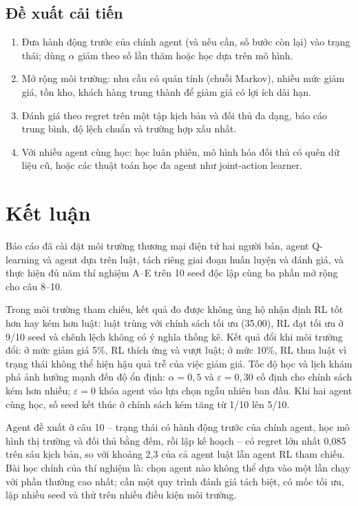 \documentclass[12pt,a4paper]{report}
\begin{document}
\subsection{Đề xuất cải tiến}
\begin{enumerate}
\item Đưa hành động trước của chính agent (và nếu cần, số bước còn lại) vào trạng
  thái; dùng $\alpha$ giảm theo số lần thăm hoặc học dựa trên mô hình.
\item Mở rộng môi trường: nhu cầu có quán tính (chuỗi Markov), nhiều mức giảm giá,
  tồn kho, khách hàng trung thành để giảm giá có lợi ích dài hạn.
\item Đánh giá theo regret trên một tập kịch bản và đối thủ đa dạng, báo cáo trung
  bình, độ lệch chuẩn và trường hợp xấu nhất.
\item Với nhiều agent cùng học: học luân phiên, mô hình hóa đối thủ có quên dữ liệu
  cũ, hoặc các thuật toán học đa agent như joint-action learner.
\end{enumerate}

\section{Kết luận}
\label{chap:conclusion}
Báo cáo đã cài đặt môi trường thương mại điện tử hai người bán, agent Q-learning và
agent dựa trên luật, tách riêng giai đoạn huấn luyện và đánh giá, và thực hiện đủ
năm thí nghiệm A--E trên 10 seed độc lập cùng ba phần mở rộng cho câu 8--10.

Trong môi trường tham chiếu, kết quả đo được không ủng hộ nhận định RL tốt hơn hay kém
hơn luật: luật trùng với chính sách tối ưu (35{,}00), RL đạt tối ưu ở 9/10 seed và
chênh lệch không có ý nghĩa thống kê. Kết quả đổi khi môi trường đổi: ở mức giảm giá
5\%, RL thích ứng và vượt luật; ở mức 10\%, RL thua luật vì trạng thái không thể hiện
hậu quả trễ của việc giảm giá. Tốc độ học và lịch khám phá ảnh hưởng mạnh đến độ ổn
định: $\alpha=0{,}5$ và $\varepsilon=0{,}30$ cố định cho chính sách kém hơn nhiều;
$\varepsilon=0$ khóa agent vào lựa chọn ngẫu nhiên ban đầu. Khi hai agent cùng học,
số seed kết thúc ở chính sách kém tăng từ 1/10 lên 5/10.

Agent đề xuất ở câu 10 -- trạng thái có hành động trước của chính agent, học mô hình
thị trường và đối thủ bằng đếm, rồi lập kế hoạch -- có regret lớn nhất 0{,}085 trên
sáu kịch bản, so với khoảng 2{,}3 của cả agent luật lẫn agent RL tham chiếu. Bài học
chính của thí nghiệm là: chọn agent nào không thể dựa vào một lần chạy với phần
thưởng cao nhất; cần một quy trình đánh giá tách biệt, có mốc tối ưu, lặp nhiều seed
và thử trên nhiều điều kiện môi trường.
\end{document}
